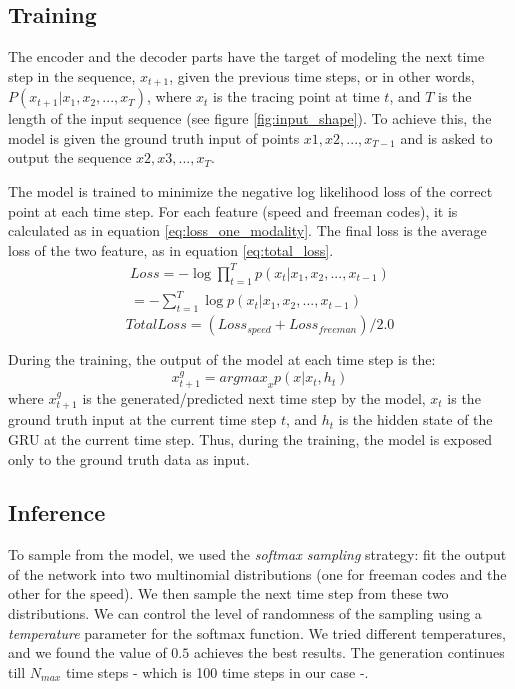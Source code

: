 \documentclass[conference]{IEEEtran}
\begin{document}
\subsection{Training}
\par The encoder and the decoder parts have the target of modeling the next time step in the sequence, $x_{t+1}$, given the previous time steps, or in other words, $P(x_{t+1}|x_1, x_2,...,x_{T})$, where $x_t$ is the tracing point at time $t$, and $T$ is the length of the input sequence (see figure \ref{fig:input_shape}).  To achieve this, the model is given the ground truth input of points $x1, x2,..., x_{T-1}$ and is asked to output the sequence $x2, x3,..., x_{T}$.

\par The model is trained to minimize the negative log likelihood loss of the correct point at each time step. For each feature (speed and freeman codes), it is calculated as in equation \ref{eq:loss_one_modality}. The final loss is the average loss of the two feature, as in equation \ref{eq:total_loss}.
\begin{equation}
    \begin{split}
    Loss = - \log \prod_{t=1}^{T} p(x_{t}|x_1, x_2,...,x_{t-1}) \\
    = - \sum_{t=1}^{T} \log p(x_{t}|x_1, x_2,...,x_{t-1})
    \label{eq:loss_one_modality}
    \end{split}
\end{equation}
\begin{equation}
    Total Loss = (Loss_{speed} + Loss_{freeman}) / 2.0
    \label{eq:total_loss}
\end{equation}

\par During the training, the output of the model at each time step is the:
\begin{equation}
    x^{g}_{t+1} = {argmax}_{x}p(x|x_{t},h_{t})
\end{equation}
where $x^{g}_{t+1}$ is the generated/predicted next time step by the model, $x_{t}$ is the ground truth input at the current time step $t$, and $h_{t}$ is the hidden state of the GRU at the current time step. Thus, during the training, the model is exposed only to the ground truth data as input.

\subsection{Inference}

\par To sample from the model, we used the \textit{softmax sampling} strategy: fit the output of the network into two multinomial distributions (one for freeman codes and the other for the speed). We then sample the next time step from these two distributions. We can control the level of randomness of the sampling using a \textit{temperature} parameter for the softmax function. We tried different temperatures, and we found the value of $0.5$ achieves the best results. The generation continues till $N_{max}$ time steps - which is 100 time steps in our case -.
\end{document}
